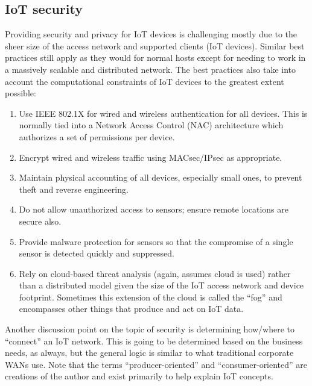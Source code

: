 \subsection{IoT security}
Providing security and privacy for IoT devices is challenging mostly due to
the sheer size of the access network and supported clients (IoT devices).
Similar best practices still apply as they would for normal hosts except for
needing to work in a massively scalable and distributed network. The best
practices also take into account the computational constraints of IoT devices
to the greatest extent possible:

\begin{enumerate}
  \item	Use IEEE 802.1X for wired and wireless authentication for all devices.
  This is normally tied into a Network Access Control (NAC) architecture which
  authorizes a set of permissions per device.
  \item	Encrypt wired and wireless traffic using MACsec/IPsec as appropriate.
  \item	Maintain physical accounting of all devices, especially small ones, to
  prevent theft and reverse engineering.
  \item	Do not allow unauthorized access to sensors; ensure remote locations
  are secure also.
  \item	Provide malware protection for sensors so that the compromise of a
  single sensor is detected quickly and suppressed.
  \item	Rely on cloud-based threat analysis (again, assumes cloud is used)
  rather than a distributed model given the size of the IoT access network and
  device footprint. Sometimes this extension of the cloud is called the
  ``fog'' and encompasses other things that produce and act on IoT data.
\end{enumerate}

Another discussion point on the topic of security is determining how/where to
``connect'' an IoT network. This is going to be determined based on the
business needs, as always, but the general logic is similar to what
traditional corporate WANs use. Note that the terms ``producer-oriented'' and
``consumer-oriented'' are creations of the author and exist primarily to help
explain IoT concepts.

